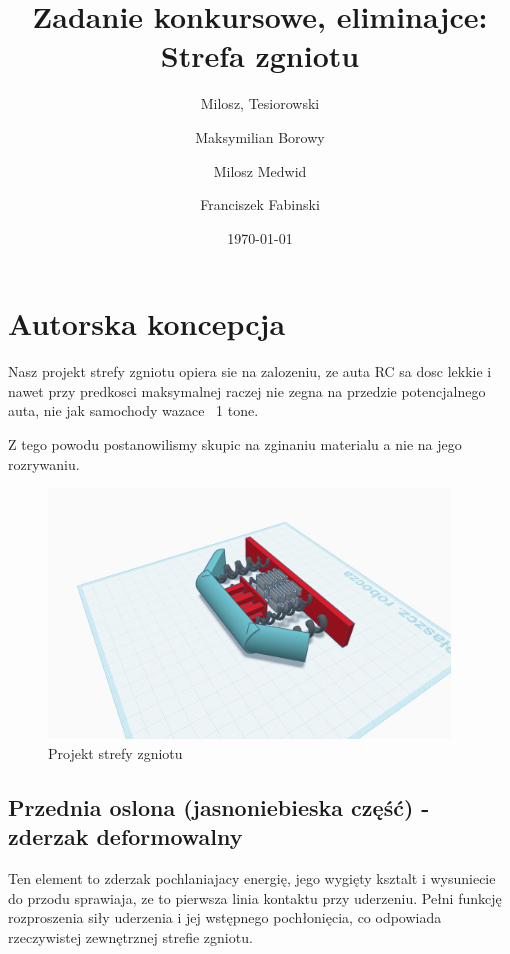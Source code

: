 \documentclass[a4paper,12pt]{article}  %
\title{Zadanie konkursowe, eliminajce:\\ Strefa zgniotu}
\author{
  Milosz, Tesiorowski\\
  \and
  Maksymilian Borowy\\
  \and
  Milosz Medwid\\
  \and
  Franciszek Fabinski\\
}
\date{\today}
\begin{document}
\maketitle  %

% 
% 

\section{Autorska koncepcja}
Nasz projekt strefy zgniotu opiera sie na zalozeniu, ze
auta RC sa dosc lekkie i nawet przy predkosci maksymalnej
raczej nie zegna na przedzie potencjalnego auta,
nie jak samochody wazace ~1 tone. 

Z tego powodu postanowilismy skupic na zginaniu materialu a nie
na jego rozrywaniu.

\begin{figure}[H]
  \centering
  \includegraphics[width=0.95\textwidth]{./pictures/pic1.png}
  \caption{Projekt strefy zgniotu}
\end{figure}


\subsection{Przednia oslona (jasnoniebieska część) - zderzak deformowalny}

Ten element to zderzak pochlaniajacy energię, jego wygięty ksztalt i wysuniecie
do przodu sprawiaja, ze to pierwsza linia kontaktu przy uderzeniu.
Pełni funkcję rozproszenia siły uderzenia i
jej wstępnego pochłonięcia, co odpowiada rzeczywistej zewnętrznej strefie zgniotu.
\end{document}

